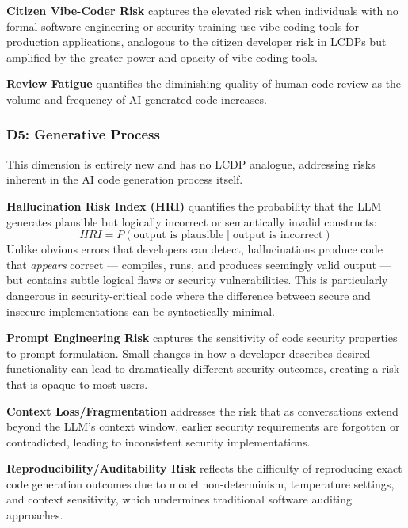 \documentclass[preprint,review,12pt]{elsarticle}
\newcommand{\hri}{\textit{HRI}}
\begin{document}
\textbf{Citizen Vibe-Coder Risk} captures the elevated risk when individuals with no formal software engineering or security training use vibe coding tools for production applications, analogous to the citizen developer risk in LCDPs but amplified by the greater power and opacity of vibe coding tools.

\textbf{Review Fatigue} quantifies the diminishing quality of human code review as the volume and frequency of AI-generated code increases.


\subsubsection{D5: Generative Process}
\label{subsubsec:d5}

This dimension is entirely new and has no LCDP analogue, addressing risks inherent in the AI code generation process itself.

\textbf{Hallucination Risk Index (HRI)} quantifies the probability that the LLM generates plausible but logically incorrect or semantically invalid constructs:
\begin{equation}
    \hri = P(\text{output is plausible} \mid \text{output is incorrect})
    \label{eq:hri}
\end{equation}
Unlike obvious errors that developers can detect, hallucinations produce code that \textit{appears} correct --- compiles, runs, and produces seemingly valid output --- but contains subtle logical flaws or security vulnerabilities. This is particularly dangerous in security-critical code where the difference between secure and insecure implementations can be syntactically minimal.

\textbf{Prompt Engineering Risk} captures the sensitivity of code security properties to prompt formulation. Small changes in how a developer describes desired functionality can lead to dramatically different security outcomes, creating a risk that is opaque to most users.

\textbf{Context Loss/Fragmentation} addresses the risk that as conversations extend beyond the LLM's context window, earlier security requirements are forgotten or contradicted, leading to inconsistent security implementations.

\textbf{Reproducibility/Auditability Risk} reflects the difficulty of reproducing exact code generation outcomes due to model non-determinism, temperature settings, and context sensitivity, which undermines traditional software auditing approaches.
\end{document}
